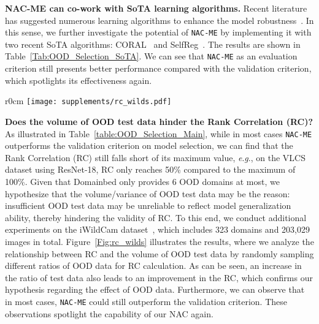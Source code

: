 \documentclass{article} \usepackage{iclr2024_conference,times}
\newcommand{\eg}{\textit{e}.\textit{g}.}
\newcommand{\bfstart}[1]{\noindent\textbf{#1.}}
\begin{document}
\bfstart{NAC-ME can co-work with SoTA learning algorithms}
Recent literature has suggested numerous learning algorithms to enhance the model robustness~\citep{Baseline:DANN,Baseline:Fish,Baseline:Fishr}. 
In this sense, we further investigate the potential of \texttt{NAC-ME} by implementing it with two recent SoTA algorithms: CORAL~\citep{Baseline:CORAL} and SelfReg~\citep{CL&DG:SelfReg}. 
The results are shown in Table~\ref{Tab:OOD_Selection_SoTA}. We can see that \texttt{NAC-ME} as an evaluation criterion still presents better performance compared with the validation criterion, which spotlights its effectiveness again.





\setlength\intextsep{3pt}
\begin{wrapfigure}[15]{r}{0cm}
	\centering
	\texttt{[image: supplements/rc\_wilds.pdf]}
	\label{Fig:rc_wilds}
\end{wrapfigure}
\noindent\textbf{Does the volume of OOD test data hinder the Rank Correlation (RC)?}
As illustrated in Table~\ref{table:OOD_Selection_Main}, while in most cases \texttt{NAC-ME} outperforms the validation criterion on model selection, 
we can find 
that the Rank Correlation (RC) still falls short of its maximum value, \eg, on the 
VLCS dataset using ResNet-18, RC only reaches 50\% compared to the maximum of 100\%.
Given that Domainbed only provides 6 OOD domains at most, we hypothesize that the volume/variance of OOD test data may be the reason: insufficient OOD test data may be unreliable to reflect model generalization ability, thereby hindering the validity of RC. 
To this end, we conduct additional experiments on the iWildCam dataset~\citep{Dataset:Wilds}, which includes 323 domains and 203,029 images in total. 
Figure~\ref{Fig:rc_wilds} illustrates the results, where we analyze the relationship between RC and the volume of OOD test data by randomly sampling different ratios of OOD data for RC calculation.
As can be seen, an increase in the ratio of test data also leads to an improvement in the RC, which confirms our hypothesis regarding the effect of OOD data. 
Furthermore, we can observe that in most cases, \texttt{NAC-ME} could still outperform the validation criterion. 
These observations spotlight the capability of our NAC again.
\end{document}
